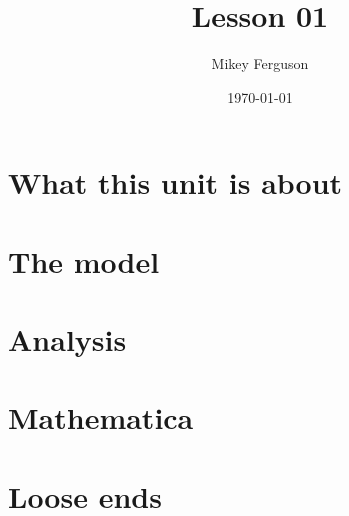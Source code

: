 \documentclass[11pt]{article}
\title{Lesson 01}
\author{Mikey Ferguson}
\date{\today}
\begin{document}
\maketitle
\tableofcontents
\bigskip

\section{What this unit is about}

\section{The model}

\section{Analysis}

\section{Mathematica}

\section{Loose ends}
\end{document}
